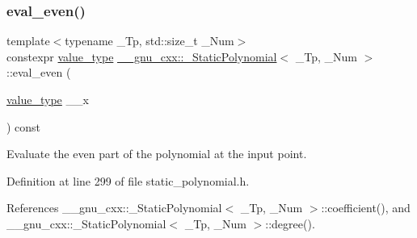 \subsubsection{\texorpdfstring{eval\+\_\+even()}{eval\_even()}\hspace{0.1cm}{\footnotesize\ttfamily [1/2]}}
{\footnotesize\ttfamily template$<$typename \+\_\+\+Tp, std\+::size\+\_\+t \+\_\+\+Num$>$ \\
constexpr \hyperlink{class____gnu__cxx_1_1__StaticPolynomial_af23110f5a002cd6caa3542df7cf35284}{value\+\_\+type} \hyperlink{class____gnu__cxx_1_1__StaticPolynomial}{\+\_\+\+\_\+gnu\+\_\+cxx\+::\+\_\+\+Static\+Polynomial}$<$ \+\_\+\+Tp, \+\_\+\+Num $>$\+::eval\+\_\+even (\begin{DoxyParamCaption}\item[{\hyperlink{class____gnu__cxx_1_1__StaticPolynomial_af23110f5a002cd6caa3542df7cf35284}{value\+\_\+type}}]{\+\_\+\+\_\+x }\end{DoxyParamCaption}) const\hspace{0.3cm}{\ttfamily [inline]}}

Evaluate the even part of the polynomial at the input point. 

Definition at line 299 of file static\+\_\+polynomial.\+h.



References \+\_\+\+\_\+gnu\+\_\+cxx\+::\+\_\+\+Static\+Polynomial$<$ \+\_\+\+Tp, \+\_\+\+Num $>$\+::coefficient(), and \+\_\+\+\_\+gnu\+\_\+cxx\+::\+\_\+\+Static\+Polynomial$<$ \+\_\+\+Tp, \+\_\+\+Num $>$\+::degree().


